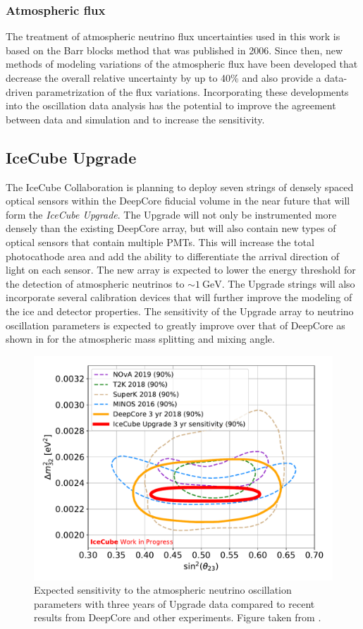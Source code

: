 \subsubsection{Atmospheric flux}
The treatment of atmospheric neutrino flux uncertainties used in this work is based on the Barr blocks method that was published in 2006\cite{Barr2006}. Since then, new methods of modeling variations of the atmospheric flux have been developed that decrease the overall relative uncertainty by up to 40\% and also provide a data-driven parametrization of the flux variations. Incorporating these developments into the oscillation data analysis has the potential to improve the agreement between data and simulation and to increase the sensitivity.

\subsection{IceCube Upgrade}
The IceCube Collaboration is planning to deploy seven strings of densely spaced optical sensors within the DeepCore fiducial volume in the near future that will form the \emph{IceCube Upgrade}. The Upgrade will not only be instrumented more densely than the existing DeepCore array, but will also contain new types of optical sensors that contain multiple PMTs. This will increase the total photocathode area and add the ability to differentiate the arrival direction of light on each sensor. The new array is expected to lower the energy threshold for the detection of atmospheric neutrinos to $\sim\SI{1}{\giga\electronvolt}$. The Upgrade strings will also incorporate several calibration devices that will further improve the modeling of the ice and detector properties. The sensitivity of the Upgrade array to neutrino oscillation parameters is expected to greatly improve over that of DeepCore as shown in  for the atmospheric mass splitting and mixing angle.
\begin{figure}
    \centering
    \includegraphics[width=0.7\linewidth]{figures/summary/June26_Upgrade_NuMu_Disappearance_Sensitivity.pdf}
    \caption{Expected sensitivity to the atmospheric neutrino oscillation parameters with three years of Upgrade data compared to recent results from DeepCore and other experiments. Figure taken from \cite{icecube_upgrade}.\label{fig:upgrade-sensitivity}}
\end{figure}


